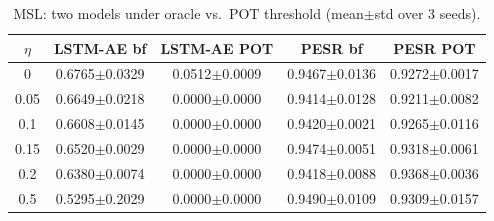 \begin{table}[t]\centering
\caption{MSL: two models under oracle vs.\ POT threshold (mean$\pm$std over 3 seeds).}
\label{tab:pot-2x2}
\begin{tabular}{ccccc}
\toprule
$\eta$ & LSTM-AE bf & LSTM-AE POT & PESR bf & PESR POT \\
\midrule
0 & 0.6765$\pm$0.0329 & 0.0512$\pm$0.0009 & 0.9467$\pm$0.0136 & 0.9272$\pm$0.0017 \\
0.05 & 0.6649$\pm$0.0218 & 0.0000$\pm$0.0000 & 0.9414$\pm$0.0128 & 0.9211$\pm$0.0082 \\
0.1 & 0.6608$\pm$0.0145 & 0.0000$\pm$0.0000 & 0.9420$\pm$0.0021 & 0.9265$\pm$0.0116 \\
0.15 & 0.6520$\pm$0.0029 & 0.0000$\pm$0.0000 & 0.9474$\pm$0.0051 & 0.9318$\pm$0.0061 \\
0.2 & 0.6380$\pm$0.0074 & 0.0000$\pm$0.0000 & 0.9418$\pm$0.0088 & 0.9368$\pm$0.0036 \\
0.5 & 0.5295$\pm$0.2029 & 0.0000$\pm$0.0000 & 0.9490$\pm$0.0109 & 0.9309$\pm$0.0157 \\
\bottomrule
\end{tabular}
\end{table}
